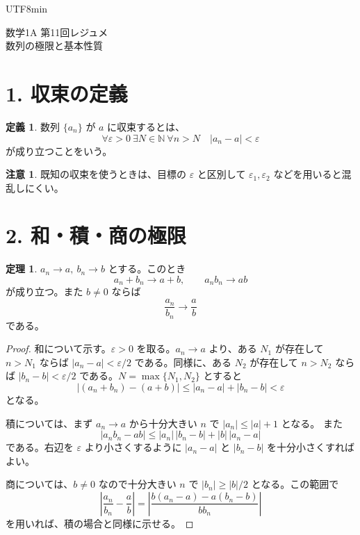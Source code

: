 \documentclass[a4paper,12pt]{article}
\begin{document}
\ifPDFTeX
\begin{CJK}{UTF8}{min}
\fi

\theoremstyle{definition}
\newtheorem*{definition}{定義}
\newtheorem*{theorem}{定理}
\newtheorem*{example}{例}
\newtheorem*{remark}{注意}
\renewcommand{\proofname}{\normalfont 証明}

\begin{center}
{\LARGE 数学1A 第11回レジュメ}\\[0.4em]
数列の極限と基本性質
\end{center}

\section*{1. 収束の定義}

\begin{definition}
数列 $\{a_n\}$ が $a$ に収束するとは、
\[
\forall \varepsilon>0\ \exists N\in\mathbb{N}\ \forall n>N\quad
|a_n-a|<\varepsilon
\]
が成り立つことをいう。
\end{definition}

\begin{remark}
既知の収束を使うときは、目標の $\varepsilon$ と区別して
$\varepsilon_1,\varepsilon_2$ などを用いると混乱しにくい。
\end{remark}

\section*{2. 和・積・商の極限}

\begin{theorem}
$a_n\to a,\ b_n\to b$ とする。このとき
\[
a_n+b_n\to a+b,\qquad a_nb_n\to ab
\]
が成り立つ。また $b\ne0$ ならば
\[
\frac{a_n}{b_n}\to \frac{a}{b}
\]
である。
\end{theorem}

\begin{proof}
和について示す。$\varepsilon>0$ を取る。$a_n\to a$ より、ある $N_1$ が存在して
$n>N_1$ ならば $|a_n-a|<\varepsilon/2$ である。同様に、ある $N_2$ が存在して
$n>N_2$ ならば $|b_n-b|<\varepsilon/2$ である。$N=\max\{N_1,N_2\}$ とすると
\[
|(a_n+b_n)-(a+b)|\le |a_n-a|+|b_n-b|<\varepsilon
\]
となる。

積については、まず $a_n\to a$ から十分大きい $n$ で $|a_n|\le |a|+1$ となる。
また
\[
|a_nb_n-ab|
\le |a_n|\,|b_n-b|+|b|\,|a_n-a|
\]
である。右辺を $\varepsilon$ より小さくするように
$|a_n-a|$ と $|b_n-b|$ を十分小さくすればよい。

商については、$b\ne0$ なので十分大きい $n$ で $|b_n|\ge |b|/2$ となる。この範囲で
\[
\left|\frac{a_n}{b_n}-\frac{a}{b}\right|
=\left|\frac{b(a_n-a)-a(b_n-b)}{bb_n}\right|
\]
を用いれば、積の場合と同様に示せる。
\end{proof}


\end{CJK}
\end{document}
